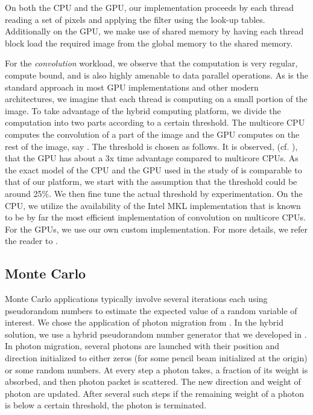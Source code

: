 \documentclass[11pt]{article}
\begin{document}
On both the CPU and the GPU, our implementation proceeds by each
thread reading a set of pixels and applying the filter using the look-up
tables. Additionally on the GPU, we make use of shared memory by having each
thread block load the required image from the global memory to the shared
memory. 



For the {\em convolution} workload, we observe that the computation is very
regular, compute bound,  and is also highly amenable to data parallel 
operations. As is the standard approach in most GPU implementations and
other modern architectures, we imagine that each thread is computing on a
small portion of the image. To take advantage of the hybrid computing
platform, we divide the computation into two parts according to a certain
threshold. The multicore CPU computes the convolution of a part of the image
 and the GPU computes on the rest of the image, say . The
threshold is chosen as follows. It is observed, (cf. \cite{isca10}), that
the GPU has about a 3x time advantage compared to multicore CPUs. As the
exact model of the CPU and the GPU used in the study of \cite{isca10} is
comparable to that of our platform, we start with the assumption that the
threshold could be around 25\%. We then fine tune the actual threshold by
experimentation. On the CPU, we utilize the availability of the Intel MKL
implementation that is known to be by far the most efficient implementation
of convolution on multicore CPUs. For the GPUs, we use our own custom
implementation. For more details, we refer the reader to \cite{srs12}.

\subsection{Monte Carlo}
Monte Carlo applications typically involve several iterations each using
pseudorandom numbers to estimate the expected value of a random variable of
interest.  We chose the application of photon
migration from \cite{bcsd02}. In the hybrid solution, we
use a hybrid pseudorandom number generator that we developed in
\cite{lspp12}. 
In photon migration, several photons are launched with their
position and direction initialized to either zeros (for some
pencil beam initialized at the origin) or some random numbers.
At every step a photon takes, a fraction of its
weight is absorbed, and then photon packet is scattered. The
new direction and weight of photon are updated. After several
such steps if the remaining weight of a photon is below a
certain threshold, the photon is terminated.
\end{document}

